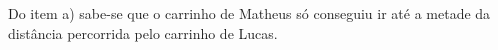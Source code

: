 \begin{multicols}{2}
\begin{orientacoes}
\begin{itemize}
\end{itemize} %




\end{orientacoes}

\begin{solucao}{}{}

Do item a) sabe-se que o carrinho de Matheus só conseguiu ir até a metade da distância percorrida pelo carrinho de Lucas. 

\hspace{-15mm} 


\end{solucao}
\end{multicols}

